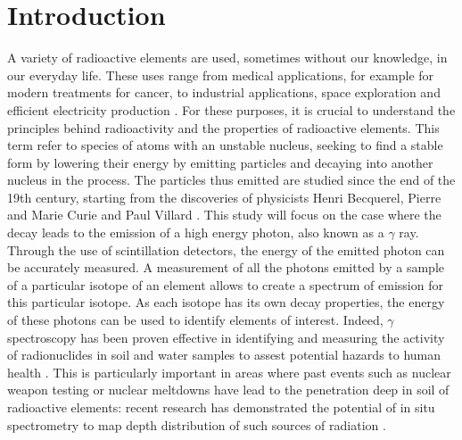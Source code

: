 \section{Introduction}
A variety of radioactive elements are used, sometimes without our knowledge, in our everyday life.
These uses range from medical applications, for example for modern treatments for cancer, to industrial applications, space exploration and efficient electricity production \cite{andrea_galindo_what_2023} \cite{esa_radiation}.
For these purposes, it is crucial to understand the principles behind radioactivity and the properties of radioactive elements.
This term refer to species of atoms with an unstable nucleus, seeking to find a stable form by lowering their energy by emitting particles and decaying into another nucleus in the process.
The particles thus emitted are studied since the end of the 19th century, starting from the discoveries of physicists Henri Becquerel, Pierre and Marie Curie and Paul Villard \cite{britannica_atom}.
This study will focus on the case where the decay leads to the emission of a high energy photon, also known as a \(\gamma\) ray.
Through the use of scintillation detectors, the energy of the emitted photon can be accurately measured.
A measurement of all the photons emitted by a sample of a particular isotope of an element allows to create a spectrum of emission for this particular isotope.
As each isotope has its own decay properties, the energy of these photons can be used to identify elements of interest.
Indeed, $\gamma$ spectroscopy has been proven effective in identifying and measuring the activity of radionuclides in soil and water samples to assest potential hazards to human health \cite{ramadhany_assessment_2022} \cite{kim_design_2022}.
This is particularly important in areas where past events such as nuclear weapon testing or nuclear meltdowns have lead to the penetration deep in soil of radioactive elements: 
recent research has demonstrated the potential of in situ spectrometry to map depth distribution of such sources of radiation \cite{varley_situ_2017}.
